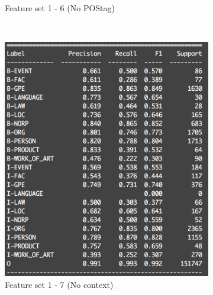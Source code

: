 \documentclass[a4paper]{article}
\begin{document}
\begin{spacing}{1.5}
\begin{figure}[t!]
\begin{subfigure}[t]{0.5\textwidth}
      \caption{Feature set 1 - 6 (No POStag)}
    \end{subfigure}
    ~ 
    \begin{subfigure}[t]{0.48\textwidth}
      \centering
      \includegraphics[width=\linewidth]{log_no_context}
      \caption{Feature set 1 - 7 (No context)}
    \end{subfigure}
    ~ 
    \begin{subfigure}[t]{0.48\textwidth}
      \centering

\end{subfigure}
\end{figure}
\end{spacing}
\end{document}
